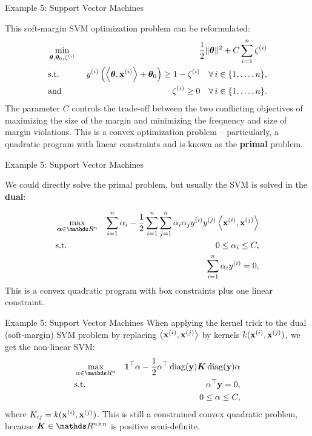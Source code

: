 \begin{frame}{Example 5: Support Vector Machines}

	This soft-margin SVM optimization problem can be reformulated:
	  \begin{eqnarray*}
		& \min\limits_{\bm{\theta}, \bm{\theta}_0,\zeta^{(i)}} & \frac{1}{2} \|\bm{\theta}\|^2 + C   \sum_{i=1}^n \zeta^{(i)} \\
		& \text{s.t.} & \,\, y^{(i)}  \left( \left\langle \bm{\theta}, \mathbf{x}^{(i)} \right\rangle + \bm{\theta}_0 \right) \geq 1 - \zeta^{(i)} \quad \forall\, i \in \{1, \ldots, n\},\\
		& \text{and} & \,\, \zeta^{(i)} \geq 0 \quad \forall\, i \in \{1, \ldots, n\}.\\
	\end{eqnarray*}
The parameter $C$ controls the trade-off between the two conflicting
objectives of maximizing the size of the margin and minimizing the frequency and size of margin
violations.
	\pause
	This is a convex optimization problem -- particularly, a quadratic program with linear constraints and is known as the \textbf{primal} problem.
	
\end{frame}

\begin{frame}{Example 5: Support Vector Machines}

We could directly solve the primal problem, but usually the SVM is solved in the \textbf{dual}:  

\begin{eqnarray*}
	& \max\limits_{\alphav \in \R^n} & \sum_{i=1}^n \alpha_i - \frac{1}{2}\sum_{i=1}^n\sum_{j=1}^n\alpha_i\alpha_j\yi y^{(j)} \scp{\xi}{\xv^{(j)}} \\
	& \text{s.t. } & 0 \le \alpha_i \le C, \\
	& \quad & \sum_{i=1}^n \alpha_i \yi = 0,
\end{eqnarray*}
\pause
This is a convex quadratic program with box constraints plus one linear constraint.


\end{frame}

\begin{frame}{Example 5: Support Vector Machines}
When applying the kernel trick to the dual (soft-margin) SVM problem by replacing $\left\langle \mathbf{x}^{(i)}, \mathbf{x}^{(j)} \right\rangle$ by kernels $k(\mathbf{x}^{(i)}, \mathbf{x}^{(j)})$, we get the non-linear SVM:
\begin{eqnarray*}
	& \max\limits_{\alpha \in \R^n} & \one^\top \alpha - \frac{1}{2} \alpha^\top \diag(\yv) \bm{K} \diag(\yv) \alpha \\
	& \text{s.t.} & \alpha^\top \yv = 0, \\
	& \quad & 0 \leq \alpha \leq C, 
\end{eqnarray*}
where $K_{ij} = k(\mathbf{x}^{(i)}, \mathbf{x}^{(j)})$. 
\pause
This is still a constrained convex quadratic problem, because $\bm{K} \in \R^{n \times n}$ is positive semi-definite. 
\end{frame}


\endlecture

